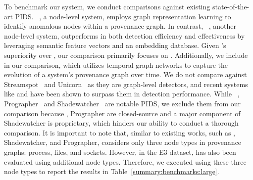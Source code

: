  To benchmark our system, we conduct comparisons against existing state-of-the-art PIDS. \threatrace~\cite{wang2022threatrace}, a node-level system, employs graph representation learning to identify anomalous nodes within a provenance graph. In contrast, \flash~\cite{flash2024}, another node-level system, outperforms \threatrace in both detection efficiency and effectiveness by leveraging semantic feature vectors and an embedding database. Given \flash's superiority over \threatrace, our comparison primarily focuses on \flash. Additionally, we include \kairos~\cite{cheng2023kairos} in our comparison, which utilizes temporal graph networks to capture the evolution of a system's provenance graph over time. We do not compare against Streamspot~\cite{streamspot} and Unicorn~\cite{han2020unicorn} as they are graph-level detectors, and recent systems like \threatrace and \flash have been shown to surpass them in detection performance. While \disdet~\cite{dong2023distdet}, Prographer~\cite{yangprographer} and Shadewatcher~\cite{shadewatcher} are notable PIDS, we exclude them from our comparison because \disdet, Prographer are closed-source and a major component of Shadewatcher is proprietary, which hinders our ability to conduct a thorough comparison. It is important to note that, similar to existing works, such as \kairos, Shadewatcher, and Prographer, \Sys considers only three node types in provenance graphs: process, files, and sockets. However, in the E3 dataset, \flash has also been evaluated using additional node types. Therefore, we executed \flash using these three node types to report the results in Table~\ref{summary:benchmarks:large}. 

